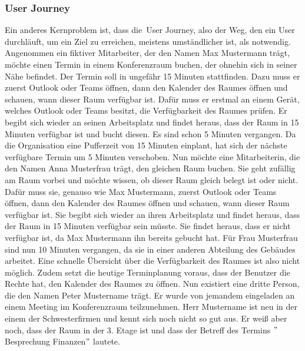 \subsubsection{User Journey}
Ein anderes Kernproblem ist, dass die~\gls{User Journey}, also der Weg, den ein User durchläuft, um ein Ziel zu erreichen, meistens umständlicher ist, als notwendig.
\newline
\newline
Angenommen ein fiktiver Mitarbeiter, der den Namen Max Mustermann trägt, möchte einen Termin in einem Konferenzraum buchen, der ohnehin sich in seiner Nähe befindet.
Der Termin soll in ungefähr 15 Minuten stattfinden.
Dazu muss er zuerst Outlook oder Teams öffnen, dann den Kalender des Raumes öffnen und schauen, wann dieser Raum verfügbar ist.
Dafür muss er erstmal an einem Gerät, welches Outlook oder Teams besitzt, die Verfügbarkeit des Raumes prüfen.
Er begibt sich wieder an seinen Arbeitsplatz und findet heraus, dass der Raum in 15 Minuten verfügbar ist und bucht diesen.
Es sind schon 5 Minuten vergangen.
Da die Organisation eine Pufferzeit von 15 Minuten einplant, hat sich der nächste verfügbare Termin um 5 Minuten verschoben.
\newline
Nun möchte eine Mitarbeiterin, die den Namen Anna Musterfrau trägt, den gleichen Raum buchen.
Sie geht zufällig am Raum vorbei und möchte wissen, ob dieser Raum gleich belegt ist oder nicht.
Dafür muss sie, genauso wie Max Mustermann, zuerst Outlook oder Teams öffnen, dann den Kalender des Raumes öffnen und schauen, wann dieser Raum verfügbar ist.
Sie begibt sich wieder an ihren Arbeitsplatz und findet heraus, dass der Raum in 15 Minuten verfügbar sein müsste.
Sie findet heraus, dass er nicht verfügbar ist, da Max Mustermann ihn bereits gebucht hat.
Für Frau Musterfrau sind nun 10 Minuten vergangen, da sie in einer anderen Abteilung des Gebäudes arbeitet.
\newline
Eine schnelle Übersicht über die Verfügbarkeit des Raumes ist also nicht möglich.
Zudem setzt die heutige Terminplanung voraus, dass der Benutzer die Rechte hat, den Kalender des Raumes zu öffnen.
\newline
\newline
Nun existiert eine dritte Person, die den Namen Peter Mustername trägt.
Er wurde von jemandem eingeladen an einem Meeting im Konferenzraum teilzunehmen.
Herr Mustername ist neu in der einem der Schwesterfirmen und kennt sich noch nicht so gut aus.
Er weiß aber noch, dass der Raum in der 3. Etage ist und dass der Betreff des Termins \("\)Besprechung Finanzen\("\) lautete.
